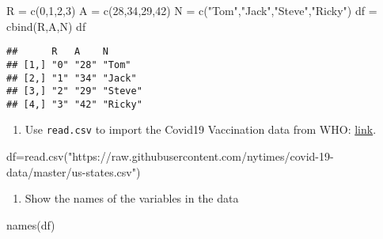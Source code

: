 \documentclass[
]{article}
\newenvironment{Shaded}{\begin{snugshade}}{\end{snugshade}}
\newcommand{\DecValTok}[1]{\textcolor[rgb]{0.00,0.00,0.81}{#1}}
\newcommand{\FunctionTok}[1]{\textcolor[rgb]{0.00,0.00,0.00}{#1}}
\newcommand{\NormalTok}[1]{#1}
\newcommand{\OtherTok}[1]{\textcolor[rgb]{0.56,0.35,0.01}{#1}}
\newcommand{\StringTok}[1]{\textcolor[rgb]{0.31,0.60,0.02}{#1}}
\providecommand{\tightlist}{%
  \setlength{\itemsep}{0pt}\setlength{\parskip}{0pt}}
\begin{document}
\begin{Shaded}
\begin{Highlighting}[]
\NormalTok{R }\OtherTok{=} \FunctionTok{c}\NormalTok{(}\DecValTok{0}\NormalTok{,}\DecValTok{1}\NormalTok{,}\DecValTok{2}\NormalTok{,}\DecValTok{3}\NormalTok{)}
\NormalTok{A }\OtherTok{=} \FunctionTok{c}\NormalTok{(}\DecValTok{28}\NormalTok{,}\DecValTok{34}\NormalTok{,}\DecValTok{29}\NormalTok{,}\DecValTok{42}\NormalTok{)}
\NormalTok{N }\OtherTok{=} \FunctionTok{c}\NormalTok{(}\StringTok{"Tom"}\NormalTok{,}\StringTok{"Jack"}\NormalTok{,}\StringTok{"Steve"}\NormalTok{,}\StringTok{"Ricky"}\NormalTok{)}
\NormalTok{df }\OtherTok{=} \FunctionTok{cbind}\NormalTok{(R,A,N)}
\NormalTok{df}
\end{Highlighting}
\end{Shaded}

\begin{verbatim}
##      R   A    N      
## [1,] "0" "28" "Tom"  
## [2,] "1" "34" "Jack" 
## [3,] "2" "29" "Steve"
## [4,] "3" "42" "Ricky"
\end{verbatim}

\begin{enumerate}
\def\labelenumi{\arabic{enumi}.}
\setcounter{enumi}{1}
\tightlist
\item
  Use \texttt{read.csv} to import the Covid19 Vaccination data from WHO:
  \href{https://raw.githubusercontent.com/nytimes/covid-19-data/master/us-states.csv}{link}.
\end{enumerate}

\begin{Shaded}
\begin{Highlighting}[]
\NormalTok{df}\OtherTok{=}\FunctionTok{read.csv}\NormalTok{(}\StringTok{"https://raw.githubusercontent.com/nytimes/covid{-}19{-}data/master/us{-}states.csv"}\NormalTok{)}
\end{Highlighting}
\end{Shaded}

\begin{enumerate}
\def\labelenumi{\arabic{enumi}.}
\setcounter{enumi}{1}
\tightlist
\item
  Show the names of the variables in the data
\end{enumerate}

\begin{Shaded}
\begin{Highlighting}[]
\FunctionTok{names}\NormalTok{(df)}
\end{Highlighting}
\end{Shaded}
\end{document}

